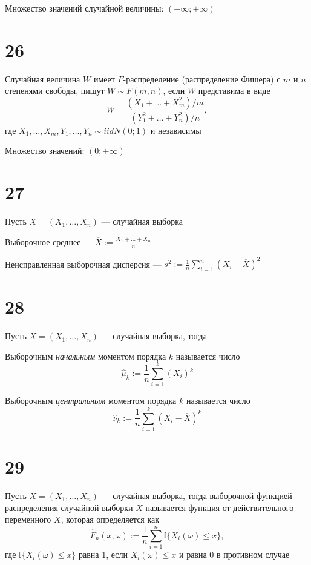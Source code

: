 \documentclass{article}
\begin{document}
Множество значений случайной величины: $(-\infty;+\infty)$

\section*{26}
 Случайная величина $W$ имеет $F$-распределение (распределение Фишера) с $m$ и $n$ степенями свободы, пишут $W\sim F(m,n)$, если $W$ представима в виде
\begin{equation*}
    W=\frac{(X_1+\ldots+X_m^2)/m}{(Y_1^2+\ldots+Y_n^2)/n},
\end{equation*}
где $X_1,\ldots,X_m,Y_1,\ldots,Y_n\sim iidN(0;1)$ и независимы

Множество значений: $(0;+\infty)$

\section*{27}
Пусть $X=(X_1,\ldots,X_n)$ — случайная выборка

 Выборочное среднее — $\overline{X}:=\displaystyle\frac{X_1+\ldots+X_n}{n}$

 Неисправленная выборочная дисперсия — $s^2:=\displaystyle\frac{1}{n}\sum_{i=1}^n (X_i-\overline{X})^2$


\section*{28}
Пусть $X=(X_1,\ldots,X_n)$ — случайная выборка, тогда 

 Выборочным \textit{начальным} моментом порядка $k$ называется число 
\begin{equation*}
    \widehat{\mu}_k:=\frac{1}{n}\sum_{i=1}^{k}(X_i)^k
\end{equation*}

 Выборочным \textit{центральным} моментом порядка $k$ называется число
\begin{equation*}
    \widehat{\nu}_k:=\frac{1}{n}\sum_{i=1}^{k}(X_i-\overline{X})^k
\end{equation*}


\section*{29}
 Пусть $X=(X_1,\ldots,X_n)$ — случайная выборка, тогда выборочной функцией распределения случайной выборки $X$ называется функция от действительного переменного $X$, которая определяется как
\begin{equation*}
    \widehat{F}_n(x,\omega):=\frac{1}{n}\sum_{i=1}^{n}\mathbb{I}\{X_i(\omega)\leqslant x\},
\end{equation*}
где $\mathbb{I}\{X_i(\omega)\leqslant x\}$ равна 1, если $X_i(\omega)\leqslant x$ и равна 0 в противном случае
\end{document}
